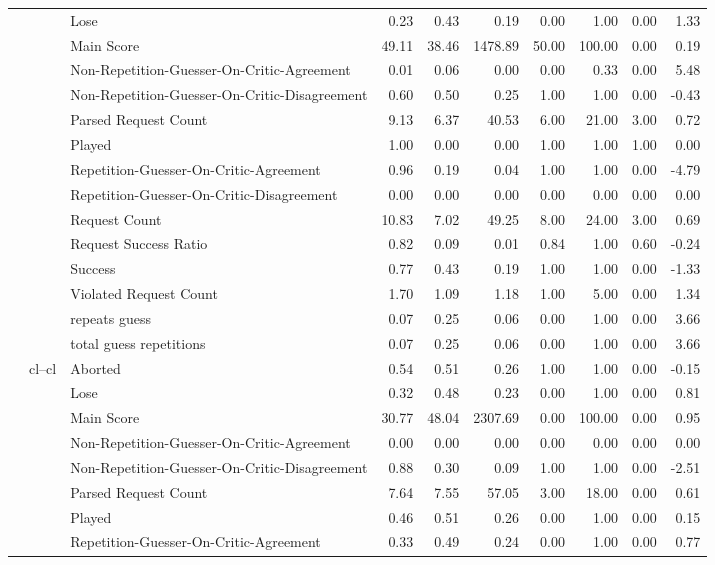 \begin{tabular}{lllrrrrrrr}
 &  & Lose & 0.23 & 0.43 & 0.19 & 0.00 & 1.00 & 0.00 & 1.33 \\
 &  & Main Score & 49.11 & 38.46 & 1478.89 & 50.00 & 100.00 & 0.00 & 0.19 \\
 &  & Non-Repetition-Guesser-On-Critic-Agreement & 0.01 & 0.06 & 0.00 & 0.00 & 0.33 & 0.00 & 5.48 \\
 &  & Non-Repetition-Guesser-On-Critic-Disagreement & 0.60 & 0.50 & 0.25 & 1.00 & 1.00 & 0.00 & -0.43 \\
 &  & Parsed Request Count & 9.13 & 6.37 & 40.53 & 6.00 & 21.00 & 3.00 & 0.72 \\
 &  & Played & 1.00 & 0.00 & 0.00 & 1.00 & 1.00 & 1.00 & 0.00 \\
 &  & Repetition-Guesser-On-Critic-Agreement & 0.96 & 0.19 & 0.04 & 1.00 & 1.00 & 0.00 & -4.79 \\
 &  & Repetition-Guesser-On-Critic-Disagreement & 0.00 & 0.00 & 0.00 & 0.00 & 0.00 & 0.00 & 0.00 \\
 &  & Request Count & 10.83 & 7.02 & 49.25 & 8.00 & 24.00 & 3.00 & 0.69 \\
 &  & Request Success Ratio & 0.82 & 0.09 & 0.01 & 0.84 & 1.00 & 0.60 & -0.24 \\
 &  & Success & 0.77 & 0.43 & 0.19 & 1.00 & 1.00 & 0.00 & -1.33 \\
 &  & Violated Request Count & 1.70 & 1.09 & 1.18 & 1.00 & 5.00 & 0.00 & 1.34 \\
 &  & repeats guess & 0.07 & 0.25 & 0.06 & 0.00 & 1.00 & 0.00 & 3.66 \\
 &  & total guess repetitions & 0.07 & 0.25 & 0.06 & 0.00 & 1.00 & 0.00 & 3.66 \\
\cline{2-10}
 & \multirow[t]{15}{*}{cl--cl} & Aborted & 0.54 & 0.51 & 0.26 & 1.00 & 1.00 & 0.00 & -0.15 \\
 &  & Lose & 0.32 & 0.48 & 0.23 & 0.00 & 1.00 & 0.00 & 0.81 \\
 &  & Main Score & 30.77 & 48.04 & 2307.69 & 0.00 & 100.00 & 0.00 & 0.95 \\
 &  & Non-Repetition-Guesser-On-Critic-Agreement & 0.00 & 0.00 & 0.00 & 0.00 & 0.00 & 0.00 & 0.00 \\
 &  & Non-Repetition-Guesser-On-Critic-Disagreement & 0.88 & 0.30 & 0.09 & 1.00 & 1.00 & 0.00 & -2.51 \\
 &  & Parsed Request Count & 7.64 & 7.55 & 57.05 & 3.00 & 18.00 & 0.00 & 0.61 \\
 &  & Played & 0.46 & 0.51 & 0.26 & 0.00 & 1.00 & 0.00 & 0.15 \\
 &  & Repetition-Guesser-On-Critic-Agreement & 0.33 & 0.49 & 0.24 & 0.00 & 1.00 & 0.00 & 0.77 \\

\end{tabular}
